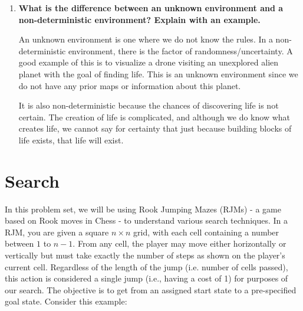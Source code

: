 \documentclass[a4paper]{article}
\begin{document}
\begin{sloppypar}
\begin{enumerate}[start=1,label=Q\arabic*,left=0pt]
    \item \textbf{What is the difference between an unknown environment and a non-deterministic environment? Explain with an example.}
    \par An unknown environment is one where we do not know the rules. In a non-deterministic environment, there is the factor of randomness/uncertainty. A good example
    of this is to visualize a drone visiting an unexplored alien planet with the goal of finding life. This is an unknown environment since we do not have any prior maps or information 
    about this planet. 
    
    It is also non-deterministic because the chances of discovering life is not certain. The creation of life is complicated,
    and although we do know what creates life, we cannot say for certainty that just because building blocks of life exists, that life will exist.

\end{enumerate}

\section{Search}

\par In this problem set, we will be using Rook Jumping Mazes (RJMs) - a game based on
Rook moves in Chess - to understand various search techniques. In a RJM, you are
given a square $n \times n$ grid, with each cell containing a number between $1$ to $n - 1$. From
any cell, the player may move either horizontally or vertically but must take exactly the
number of steps as shown on the player’s current cell. Regardless of the length of the
jump (i.e. number of cells passed), this action is considered a single jump (i.e., having a
cost of 1) for purposes of our search. The objective is to get from an assigned start state
to a pre-specified goal state. Consider this example:


\end{sloppypar}
\end{document}
